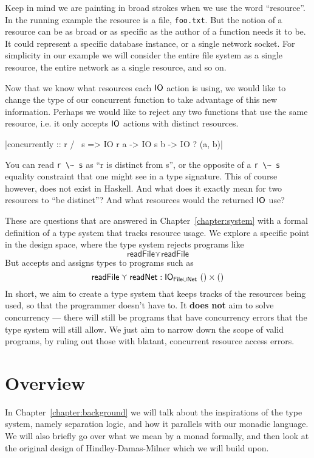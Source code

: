 \documentclass{report}
\begin{document}
Keep in mind we are painting in broad strokes when we use the word
``resource''. In the running example the resource is a file,
\texttt{foo.txt}. But the notion of a resource can be as broad or as specific as
the author of a function needs it to be. It could represent a specific database
instance, or a single network socket. For simplicity in our example we will
consider the entire file system as a single resource, the entire network as
a single resource, and so on.

Now that we know what resources each $\mathsf{IO}$ action is using, we would like to
change the type of our concurrent function to take advantage of this new
information. Perhaps we would like to reject any two functions that use the same
resource, i.e. it only accepts $\mathsf{IO}$ actions with distinct resources.

|concurrently :: r /~ s => IO r a -> IO s b -> IO ? (a, b)|

You can read \verb$r \~ s$ as ``r is distinct from s'', or the opposite of a
\verb$r \~ s$ equality constraint that one might see in a type signature. This
of course however, does not exist in Haskell.  And what does it exactly mean for
two resources to ``be distinct''? And what resources would the returned $\mathsf{IO}$
use?

These are questions that are answered in Chapter~\ref{chapter:system} with a
formal definition of a type system that tracks resource usage. We explore a
specific point in the design space, where the type system rejects programs like
\[
\textsf{readFile} \curlyvee \textsf{readFile}
\]
But accepts and assigns types to programs such as
\[
\textsf{readFile} \curlyvee \textsf{readNet} : \mathsf{IO}_{\textsf{File} \cup \textsf{Net}} \ () \times ()
\]
In short, we aim to create a type system that keeps tracks of the resources
being used, so that the programmer doesn't have to. It \textbf{does not} aim to
solve concurrency --- there will still be programs that have concurrency errors
that the type system will still allow. We just aim to narrow down the scope of
valid programs, by ruling out those with blatant, concurrent resource access
errors. 

\section{Overview}

In Chapter~\ref{chapter:background} we will talk about the inspirations of the
type system, namely separation logic, and how it parallels with our monadic
language. We will also briefly go over what we mean by a monad formally, and
then look at the original design of Hindley-Damas-Milner which we will build upon.
\end{document}

